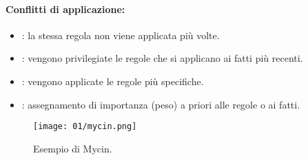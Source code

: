 \paragraph{Conflitti di applicazione:}

\begin{itemize}
\item {}: la stessa regola non viene applicata più volte.
\item {}: vengono privilegiate le regole che si applicano ai fatti
più recenti. 
\item {}: vengono applicate le regole più specifiche.
\item {}: assegnamento di importanza (peso) a priori alle regole
o ai fatti.
\end{itemize}



\begin{figure}[h]
    \centering
    \texttt{[image: 01/mycin.png]}
    \caption{Esempio di Mycin.}
\end{figure}






